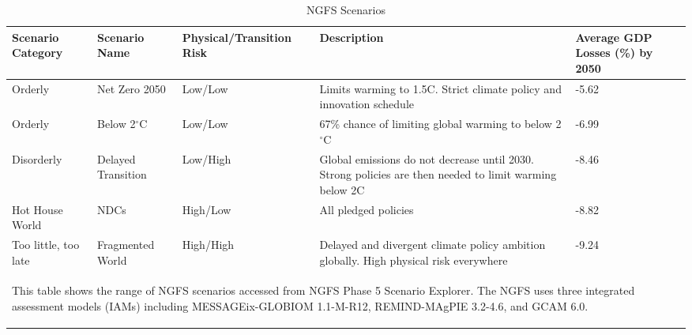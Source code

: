 
\begin{table}[tb!]
\footnotesize
\center
\caption{NGFS Scenarios}
\label{tab:tab2}
\begin{tabularx}{\textwidth}{X X X X X}
\hline
Scenario Category & Scenario Name & Physical/Transition Risk & Description & Average GDP Losses (\%) by 2050\\
\hline
Orderly & Net Zero 2050 & Low/Low & Limits warming to 1.5C. Strict climate policy and innovation schedule &  -5.62 \\
Orderly & Below 2$^\circ$C & Low/Low & 67\% chance of limiting global warming to below 2$^\circ$C &  -6.99 \\
Disorderly & Delayed Transition & Low/High & Global emissions do not decrease until 2030. Strong policies are then needed to limit warming below 2C &  -8.46 \\
Hot House World & NDCs & High/Low & All pledged policies &  -8.82 \\
Too little, too late & Fragmented World & High/High & Delayed and divergent climate policy ambition globally. High physical risk everywhere &  -9.24 \\
\hline
\multicolumn{5}{p{\textwidth}}{\begin{footnotesize}This table shows the range of NGFS scenarios accessed from NGFS Phase 5 Scenario Explorer. The NGFS uses three integrated assessment models (IAMs) including MESSAGEix-GLOBIOM 1.1-M-R12, REMIND-MAgPIE 3.2-4.6, and GCAM 6.0.
\end{footnotesize}
}
\end{tabularx}
\end{table}
